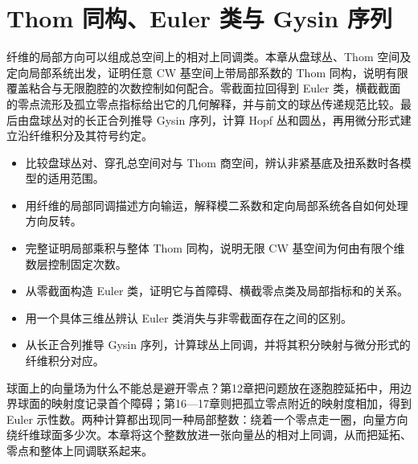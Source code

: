 
% 
% 

\chapter{Thom 同构、Euler 类与 Gysin 序列}
\label{g2:ch:20}

\begin{chapterabstract}
	纤维的局部方向可以组成总空间上的相对上同调类。本章从盘球丛、Thom 空间及定向局部系统出发，证明任意 CW 基空间上带局部系数的 Thom 同构，说明有限覆盖粘合与无限胞腔的次数控制如何配合。零截面拉回得到 Euler 类，横截截面的零点流形及孤立零点指标给出它的几何解释，并与前文的球丛传递规范比较。最后由盘球丛对的长正合列推导 Gysin 序列，计算 Hopf 丛和圆丛，再用微分形式建立沿纤维积分及其符号约定。
\end{chapterabstract}

\begin{learninggoals}
	\begin{itemize}
		\item 比较盘球丛对、穿孔总空间对与 Thom 商空间，辨认非紧基底及扭系数时各模型的适用范围。
		\item 用纤维的局部同调描述方向输运，解释模二系数和定向局部系统各自如何处理方向反转。
		\item 完整证明局部乘积与整体 Thom 同构，说明无限 CW 基空间为何由有限个维数层控制固定次数。
		\item 从零截面构造 Euler 类，证明它与首障碍、横截零点类及局部指标和的关系。
		\item 用一个具体三维丛辨认 Euler 类消失与非零截面存在之间的区别。
		\item 从长正合列推导 Gysin 序列，计算球丛上同调，并将其积分映射与微分形式的纤维积分对应。
	\end{itemize}
\end{learninggoals}

球面上的向量场为什么不能总是避开零点？第12章把问题放在逐胞腔延拓中，用边界球面的映射度记录首个障碍；第16—17章则把孤立零点附近的映射度相加，得到 Euler 示性数。两种计算都出现同一种局部整数：绕着一个零点走一圈，向量方向绕纤维球面多少次。本章将这个整数放进一张向量丛的相对上同调，从而把延拓、零点和整体上同调联系起来。

